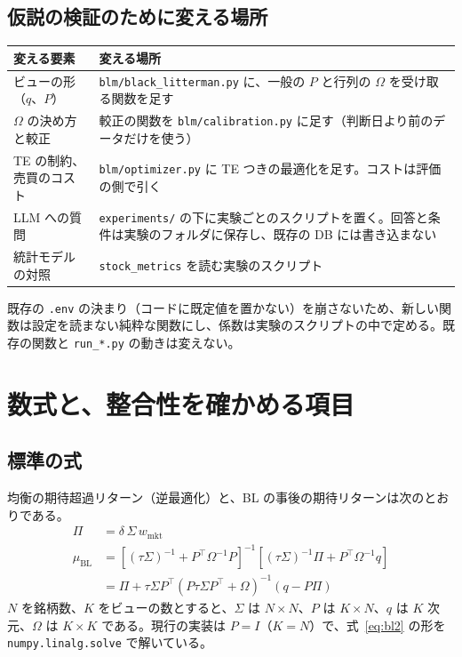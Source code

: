 \documentclass[xelatex,ja=standard,jafont=haranoaji,a4paper,10pt,openany]{bxjsreport}
\newcommand{\code}[1]{\texttt{#1}}
\newcommand{\T}{^{\top}}
\newcommand{\muBL}{\mu_{\mathrm{BL}}}
\newcommand{\wmkt}{w_{\mathrm{mkt}}}
\begin{document}
\section{仮説の検証のために変える場所}

\begin{center}
\small
\begin{tabular}{p{4.2cm}p{10.0cm}}
\toprule
変える要素 & 変える場所 \\
\midrule
ビューの形（$q$、$P$） & \code{blm/black\_litterman.py} に、一般の $P$ と行列の $\Omega$ を受け取る関数を足す \\
$\Omega$ の決め方と較正 & 較正の関数を \code{blm/calibration.py} に足す（判断日より前のデータだけを使う） \\
TE の制約、売買のコスト & \code{blm/optimizer.py} に TE つきの最適化を足す。コストは評価の側で引く \\
LLM への質問 & \code{experiments/} の下に実験ごとのスクリプトを置く。回答と条件は実験のフォルダに保存し、既存の DB には書き込まない \\
統計モデルの対照 & \code{stock\_metrics} を読む実験のスクリプト \\
\bottomrule
\end{tabular}
\end{center}

既存の \code{.env} の決まり（コードに既定値を置かない）を崩さないため、新しい関数は設定を読まない純粋な関数にし、係数は実験のスクリプトの中で定める。既存の関数と \code{run\_*.py} の動きは変えない。

\chapter{数式と、整合性を確かめる項目}\label{ch:math}

\section{標準の式}

均衡の期待超過リターン（逆最適化）と、BL の事後の期待リターンは次のとおりである。
\begin{align}
\Pi&=\delta\,\Sigma\,\wmkt\label{eq:pi}\\
\muBL&=\left[(\tau\Sigma)^{-1}+P\T\Omega^{-1}P\right]^{-1}\left[(\tau\Sigma)^{-1}\Pi+P\T\Omega^{-1}q\right]\label{eq:bl1}\\
&=\Pi+\tau\Sigma P\T\left(P\tau\Sigma P\T+\Omega\right)^{-1}(q-P\Pi)\label{eq:bl2}
\end{align}
$N$ を銘柄数、$K$ をビューの数とすると、$\Sigma$ は $N\times N$、$P$ は $K\times N$、$q$ は $K$ 次元、$\Omega$ は $K\times K$ である。現行の実装は $P=I$（$K=N$）で、式~\eqref{eq:bl2} の形を \code{numpy.linalg.solve} で解いている。
\end{document}
